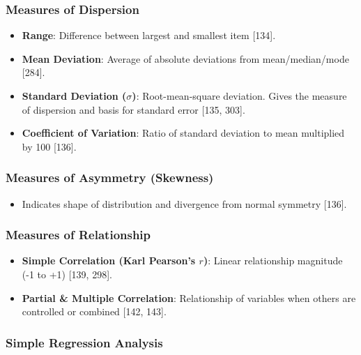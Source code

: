 \documentclass[
]{article}
\providecommand{\tightlist}{%
  \setlength{\itemsep}{0pt}\setlength{\parskip}{0pt}}
\begin{document}
\subsubsection{Measures of Dispersion}\label{measures-of-dispersion}

\begin{itemize}
\tightlist
\item
  \textbf{Range}: Difference between largest and smallest item
  {[}134{]}.
\item
  \textbf{Mean Deviation}: Average of absolute deviations from
  mean/median/mode {[}284{]}.
\item
  \textbf{Standard Deviation (\(\sigma\))}: Root-mean-square deviation.
  Gives the measure of dispersion and basis for standard error {[}135,
  303{]}.
\item
  \textbf{Coefficient of Variation}: Ratio of standard deviation to mean
  multiplied by 100 {[}136{]}.
\end{itemize}

\subsubsection{Measures of Asymmetry
(Skewness)}\label{measures-of-asymmetry-skewness}

\begin{itemize}
\tightlist
\item
  Indicates shape of distribution and divergence from normal symmetry
  {[}136{]}.
\end{itemize}

\subsubsection{Measures of Relationship}\label{measures-of-relationship}

\begin{itemize}
\tightlist
\item
  \textbf{Simple Correlation (Karl Pearson's \(r\))}: Linear
  relationship magnitude (-1 to +1) {[}139, 298{]}.
\item
  \textbf{Partial \& Multiple Correlation}: Relationship of variables
  when others are controlled or combined {[}142, 143{]}.
\end{itemize}

\subsubsection{Simple Regression
Analysis}\label{simple-regression-analysis}
\end{document}
